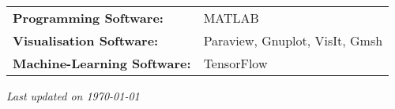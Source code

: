 \documentclass[margin]{res}
\begin{document}
\begin{resume}
\begin{tabular}{l p{3in}}
    {\bf Programming Software:} &  MATLAB \\
    
    {\bf Visualisation Software:} & Paraview, Gnuplot, VisIt, Gmsh \\
    
    {\bf Machine-Learning Software:} & TensorFlow
 \end{tabular}


\end{resume} 


\vfill
\begin{flushright}
\textit{Last updated on \today}
\end{flushright}
\end{document}
